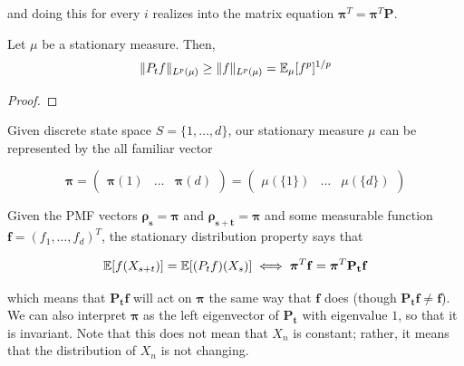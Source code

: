 	and doing this for every $i$ realizes into the matrix equation $\boldsymbol{\pi}^T = \boldsymbol{\pi}^T \mathbf{P}$. 

	\begin{lemma}
		\label{thm:contraction-of-stationary-measure}
		Let $\mu$ be a stationary measure. Then, 
		\begin{equation}
			\|P_t f\|_{L^p(\mu)} \geq \|f\|_{L^p (\mu)} = \operatorname{\mathbb{E}}_\mu [f^p]^{1/p}
		\end{equation}
	\end{lemma}
	\begin{proof}
	  
	\end{proof}

	\begin{example}
		\label{ex:stationary-distribution-in-discrete-space}
		Given discrete state space $S = \{1, \ldots, d\}$, our stationary measure $\mu$ can be represented by the all familiar vector 

			\begin{equation}
				\boldsymbol{\pi} = \begin{pmatrix} \boldsymbol{\pi} (1) & \ldots & \boldsymbol{\pi} (d) \end{pmatrix} = \begin{pmatrix} \mu(\{1\}) & \ldots & \mu(\{d\}) \end{pmatrix}
			\end{equation}
			 

		Given the PMF vectors $\boldsymbol{\rho_s} = \boldsymbol{\pi}$ and $\boldsymbol{\rho_{s + t}} = \boldsymbol{\pi}$ and some measurable function $\mathbf{f} = (f_1, \ldots, f_d)^T$, the stationary distribution property says that 

			\begin{equation}
				\operatorname{\mathbb{E}}[f(X_{s + t})] = \operatorname{\mathbb{E}}[(P_t f)(X_s)] \iff \boldsymbol{\pi}^T \mathbf{f} = \boldsymbol{\pi}^T \mathbf{P_t} \mathbf{f}
			\end{equation}

		which means that $\mathbf{P_t} \mathbf{f}$ will act on $\boldsymbol{\pi}$ the same way that $\mathbf{f}$ does (though $\mathbf{P_t} \mathbf{f} \neq \mathbf{f}$). We can also interpret $\boldsymbol{\pi}$ as the left eigenvector of $\mathbf{P_t}$ with eigenvalue $1$, so that it is invariant. Note that this does not mean that $X_n$ is constant; rather, it means that the distribution of $X_n$ is not changing. 
	\end{example}

